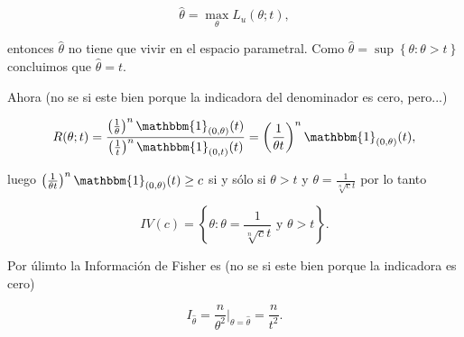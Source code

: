 \documentclass[letterpaper]{article}
\theoremstyle{definition}
\theoremstyle{lemathm}
\theoremstyle{lemathm}
\theoremstyle{lemathm}
\theoremstyle{lemademthm}
\newcommand{\txty}{\text{ y }}
\newcommand{\pars}[1]{\left( #1 \right) }
\newcommand{\set}[1]{\left \{ #1 \right\} }
\newcommand{\1}{\mathbbm{1}}
\begin{document}
\begin{enumerate}
		\[\hat{\theta} = \max_{\theta} L_u(\theta;t),\]

		entonces $\hat{\theta}$ no tiene que vivir en el espacio parametral. Como $\hat{\theta} = \sup{\set{\theta: \theta > t}}$ concluimos que $\hat{\theta} = t$.

		Ahora (no se si este bien porque la indicadora del denominador es cero, pero...)

		\[R(\theta;t) = \frac{\pars{\frac{1}{\theta}}^n \1_{\pars{0,\theta}}(t)}{\pars{\frac{1}{t}}^n \1_{\pars{0,t}}(t)} = \pars{\frac{1}{\theta t}}^n \1_{\pars{0,\theta}}(t),\]

		luego $\pars{\frac{1}{\theta t}}^n \1_{\pars{0,\theta}}(t) \geq c$ si y sólo si $\theta > t$ y $\theta = \frac{1}{\sqrt[n]{c}t}$ por lo tanto

		\[IV(c) = \set{\theta : \theta = \frac{1}{\sqrt[n]{c}t} \txty \theta > t}.\]

		Por úlimto la Información de Fisher es (no se si este bien porque la indicadora es cero)

		\[I_{\hat{\theta}} = \frac{n}{\theta^2}\bigg\rvert_{\theta=\hat{\theta}} = \frac{n}{t^2}.\]


    \end{enumerate}

	
\end{document}
